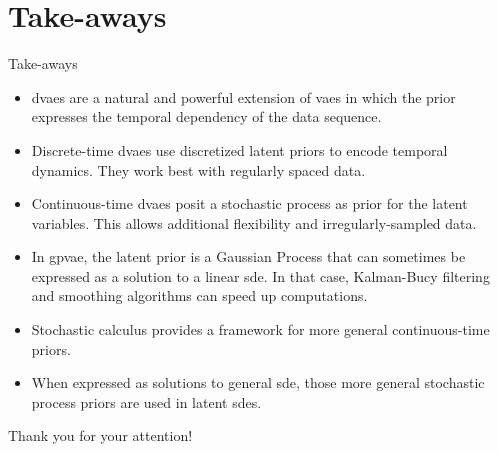 \section{Take-aways}\label{Take-aways}

\begin{frame}{Take-aways}
    \begin{itemize}
        \item <1-> \glspl{dvae} are a natural and powerful extension of \glspl{vae} in which the prior expresses the temporal dependency of
        the data sequence.
        \item <2-> Discrete-time \glspl{dvae} use discretized latent priors to encode temporal dynamics. They work best with regularly spaced data.
        \item <3-> Continuous-time \glspl{dvae} posit a stochastic process as prior for the latent variables. This allows 
        additional flexibility and irregularly-sampled data.
        \item <4-> In \gls{gpvae}, the latent prior is a Gaussian Process that can sometimes be expressed as a 
        solution to a linear \gls{sde}. In that case, Kalman-Bucy filtering and smoothing algorithms can speed up 
        computations.
        \item <5-> Stochastic calculus provides a framework for more general continuous-time priors.
        \item <6-> When expressed as solutions to general \gls{sde}, those more general stochastic process priors are used in 
        \glspl{latent sde}.
    \end{itemize}
\end{frame}

\begin{frame}
    \Huge
    \centering
    Thank you for your attention!
\end{frame}